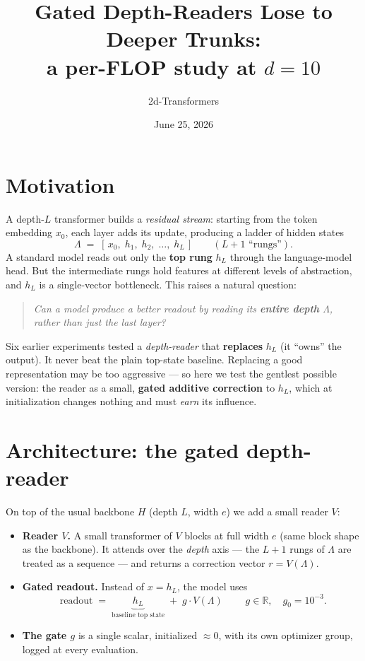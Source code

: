 \documentclass[11pt]{article}
\title{\vspace{-1.5em}Gated Depth-Readers Lose to Deeper Trunks:\\
       a per-FLOP study at $d{=}10$\vspace{-0.5em}}
\author{2d-Transformers}
\date{June 25, 2026}
\begin{document}
\maketitle
\vspace{-1em}

\section{Motivation}

A depth-$L$ transformer builds a \emph{residual stream}: starting from the token embedding $x_0$, each
layer adds its update, producing a ladder of hidden states
\[
\Lambda \;=\; [\,x_0,\; h_1,\; h_2,\; \dots,\; h_L\,] \qquad (L{+}1 \text{ ``rungs''}).
\]
A standard model reads out only the \textbf{top rung} $h_L$ through the language-model head. But the
intermediate rungs hold features at different levels of abstraction, and $h_L$ is a single-vector
bottleneck. This raises a natural question:

\begin{quote}
\emph{Can a model produce a better readout by reading its \textbf{entire depth} $\Lambda$, rather than
just the last layer?}
\end{quote}

Six earlier experiments tested a \emph{depth-reader} that \textbf{replaces} $h_L$ (it ``owns'' the
output). It never beat the plain top-state baseline. Replacing a good representation may be too
aggressive --- so here we test the gentlest possible version: the reader as a small, \textbf{gated
additive correction} to $h_L$, which at initialization changes nothing and must \emph{earn} its
influence.

\section{Architecture: the gated depth-reader}

On top of the usual backbone $H$ (depth $L$, width $e$) we add a small reader $V$:

\begin{itemize}\itemsep2pt
  \item \textbf{Reader $V$.} A small transformer of $V$ blocks at full width $e$ (same block shape as
  the backbone). It attends over the \emph{depth} axis --- the $L{+}1$ rungs of $\Lambda$ are treated
  as a sequence --- and returns a correction vector $r = V(\Lambda)$.
  \item \textbf{Gated readout.} Instead of $x = h_L$, the model uses
  \[
  \boxed{\;\text{readout} \;=\; \underbrace{h_L}_{\text{baseline top state}} \;+\; g\cdot V(\Lambda)\;}
  \qquad g\in\mathbb{R},\quad g_0 = 10^{-3}.
  \]
  \item \textbf{The gate $g$} is a single scalar, initialized $\approx 0$, with its own optimizer
  group, logged at every evaluation.
\end{itemize}
\end{document}

